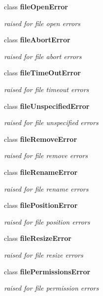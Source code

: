 \begin{DoxyCompactItemize}
class {\bf file\-Open\-Error}
\begin{DoxyCompactList}\small\item\em raised for file open errors \end{DoxyCompactList}\item 
class {\bf file\-Abort\-Error}
\begin{DoxyCompactList}\small\item\em raised for file abort errors \end{DoxyCompactList}\item 
class {\bf file\-Time\-Out\-Error}
\begin{DoxyCompactList}\small\item\em raised for file timeout errors \end{DoxyCompactList}\item 
class {\bf file\-Unspecified\-Error}
\begin{DoxyCompactList}\small\item\em raised for file unspecified errors \end{DoxyCompactList}\item 
class {\bf file\-Remove\-Error}
\begin{DoxyCompactList}\small\item\em raised for file remove errors \end{DoxyCompactList}\item 
class {\bf file\-Rename\-Error}
\begin{DoxyCompactList}\small\item\em raised for file rename errors \end{DoxyCompactList}\item 
class {\bf file\-Position\-Error}
\begin{DoxyCompactList}\small\item\em raised for file position errors \end{DoxyCompactList}\item 
class {\bf file\-Resize\-Error}
\begin{DoxyCompactList}\small\item\em raised for file resize errors \end{DoxyCompactList}\item 
class {\bf file\-Permissions\-Error}
\begin{DoxyCompactList}\small\item\em raised for file permission errors \end{DoxyCompactList}\item 

\end{DoxyCompactItemize}
